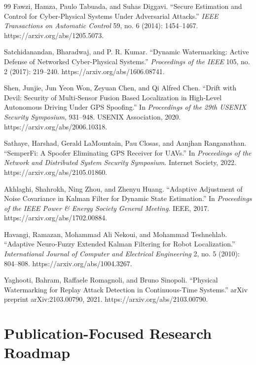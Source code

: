\documentclass[11pt,a4paper]{article}
\begin{document}
\begin{thebibliography}{99}
Fawzi, Hamza, Paulo Tabuada, and Suhas Diggavi.
``Secure Estimation and Control for Cyber-Physical Systems Under Adversarial Attacks.''
\textit{IEEE Transactions on Automatic Control} 59, no. 6 (2014): 1454--1467.
https://arxiv.org/abs/1205.5073.

Satchidanandan, Bharadwaj, and P. R. Kumar.
``Dynamic Watermarking: Active Defense of Networked Cyber-Physical Systems.''
\textit{Proceedings of the IEEE} 105, no. 2 (2017): 219--240.
https://arxiv.org/abs/1606.08741.

Shen, Junjie, Jun Yeon Won, Zeyuan Chen, and Qi Alfred Chen.
``Drift with Devil: Security of Multi-Sensor Fusion Based Localization in High-Level Autonomous Driving Under GPS Spoofing.''
In \textit{Proceedings of the 29th USENIX Security Symposium}, 931--948.
USENIX Association, 2020.
https://arxiv.org/abs/2006.10318.

Sathaye, Harshad, Gerald LaMountain, Pau Closas, and Aanjhan Ranganathan.
``SemperFi: A Spoofer Eliminating GPS Receiver for UAVs.''
In \textit{Proceedings of the Network and Distributed System Security Symposium}.
Internet Society, 2022.
https://arxiv.org/abs/2105.01860.

Akhlaghi, Shahrokh, Ning Zhou, and Zhenyu Huang.
``Adaptive Adjustment of Noise Covariance in Kalman Filter for Dynamic State Estimation.''
In \textit{Proceedings of the IEEE Power \& Energy Society General Meeting}.
IEEE, 2017.
https://arxiv.org/abs/1702.00884.

Havangi, Ramazan, Mohammad Ali Nekoui, and Mohammad Teshnehlab.
``Adaptive Neuro-Fuzzy Extended Kalman Filtering for Robot Localization.''
\textit{International Journal of Computer and Electrical Engineering} 2, no. 5 (2010): 804--808.
https://arxiv.org/abs/1004.3267.

Yaghooti, Bahram, Raffaele Romagnoli, and Bruno Sinopoli.
``Physical Watermarking for Replay Attack Detection in Continuous-Time Systems.''
arXiv preprint arXiv:2103.00790, 2021.
https://arxiv.org/abs/2103.00790.
\end{thebibliography}

\section{Publication-Focused Research Roadmap}
\label{sec:roadmap}
\end{document}
